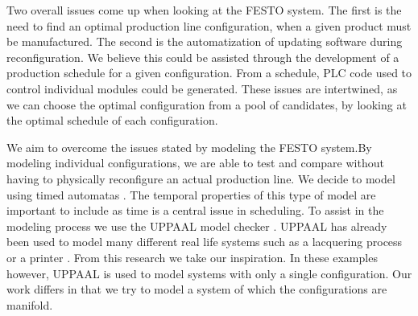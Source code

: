 Two overall issues come up when looking at the FESTO system. The first is the need to find an optimal production line configuration, when a given product must be manufactured. The second is the automatization of updating software during reconfiguration. We believe this could be assisted through the development of a production schedule for a given configuration. From a schedule,  PLC code used to control individual modules could be generated. These issues are intertwined, as we can choose the optimal configuration from a pool of candidates, by looking at the optimal schedule of each configuration. 

We aim to overcome the issues stated by modeling  the FESTO system.By modeling individual configurations, we are able to test and compare without having to physically reconfigure an actual production line. We decide to model using timed automatas . The temporal properties of this type of model are important to include as time is a central issue in scheduling. To assist in the modeling process we use the UPPAAL model checker \cite{Larsen97uppaalin} . UPPAAL has already been used to model many different real life systems such as a lacquering process \cite{so54514} or a printer \cite{Igna2008}. From this research we take our inspiration. In these examples however, UPPAAL is used to model systems with only a single configuration. Our work differs in that we try to model a system of which the configurations are manifold. 

